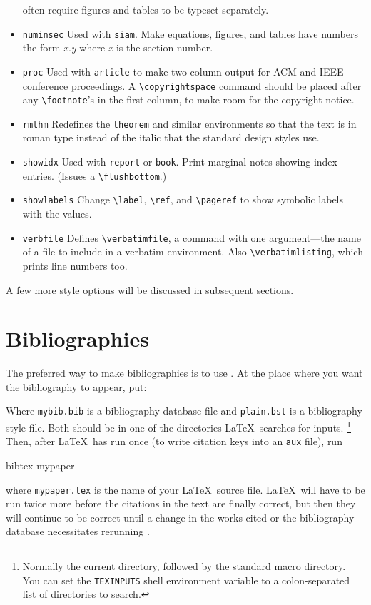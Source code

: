 \begin{itemize}
often require figures and tables to be typeset separately.
\item[] \hbox{\tt numinsec}
Used with \verb|siam|.
Make equations, figures, and tables have numbers
the form {\it x.y} where {\it x} is the section number.
\item[] \hbox{\tt proc}
Used with \verb|article| to make two-column output for ACM and
IEEE conference proceedings.
A \verb|\copyrightspace| command should be placed after any \verb|\footnote|'s
in the first column, to make room for the copyright notice.
\item[] \hbox{\tt rmthm}
Redefines the {\tt theorem} and similar environments
so that the text is in roman type instead of the italic that the
standard design styles use.
\item[] \hbox{\tt showidx}
Used with \verb|report| or \verb|book|.
Print marginal notes showing index entries.
(Issues a \verb|\flushbottom|.)
\item[] \hbox{\tt showlabels}
Change \verb|\label|, \verb|\ref|, and \verb|\pageref| to show
symbolic labels with the values.
\item[] \hbox{\tt verbfile}
Defines \verb|\verbatimfile|, a command with one argument---the name
of a file to include in a verbatim environment.
Also \verb|\verbatimlisting|, which prints line numbers too.
\end{itemize}

A few more style options will be discussed in subsequent sections.
 
\section{Bibliographies}

The preferred way to make bibliographies is to use \BibTeX.
At the place where you want the bibliography to appear, put:
\begin{eg}


\end{eg}
Where \verb|mybib.bib| is a bibliography database file and
\verb|plain.bst| is a bibliography style file.
Both should be in one of the directories \LaTeX\ searches for inputs.%
\footnote{Normally the current directory, followed by the standard
macro directory.  You can set the \verb|TEXINPUTS|
shell environment variable to a colon-separated list of directories
to search.}
Then, after \LaTeX\ has run once (to write citation keys into
an \verb|aux| file), run
\begin{eg}
bibtex mypaper
\end{eg}
where \verb|mypaper.tex| is the name of your \LaTeX\ source file.
\LaTeX\ will have to be run twice more before the citations in the
text are finally correct, but then they will continue to be correct
until a change in the works cited or the bibliography database
necessitates rerunning \BibTeX.

